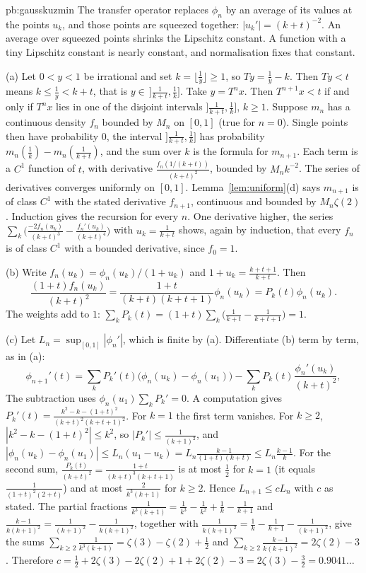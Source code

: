 \begin{solution}{pb:gausskuzmin}
\idea The transfer operator replaces $\phi_n$ by an average of its values at the points $u_k$, and those points are squeezed together: $|u_k'|=(k+t)^{-2}$. An average over squeezed points shrinks the Lipschitz constant. A function with a tiny Lipschitz constant is nearly constant, and normalisation fixes that constant.

\writeup (a) Let $0<y<1$ be irrational and set $k=\lfloor\frac1y\rfloor\ge1$, so $Ty=\frac1y-k$. Then $Ty<t$ means $k\le\frac1y<k+t$, that is $y\in\,]\frac1{k+t},\frac1k]$. Take $y=T^nx$. Then $T^{n+1}x<t$ if and only if $T^nx$ lies in one of the disjoint intervals $]\frac1{k+t},\frac1k]$, $k\ge1$. Suppose $m_n$ has a continuous density $f_n$ bounded by $M_n$ on $[0,1]$ (true for $n=0$). Single points then have probability $0$, the interval $]\frac1{k+t},\frac1k]$ has probability $m_n(\frac1k)-m_n(\frac1{k+t})$, and the sum over $k$ is the formula for $m_{n+1}$. Each term is a $C^1$ function of $t$, with derivative $\frac{f_n(1/(k+t))}{(k+t)^2}$, bounded by $M_nk^{-2}$. The series of derivatives converges uniformly on $[0,1]$. Lemma~\ref{lem:uniform}(d) says $m_{n+1}$ is of class $C^1$ with the stated derivative $f_{n+1}$, continuous and bounded by $M_n\zeta(2)$. Induction gives the recursion for every $n$. One derivative higher, the series $\sum_k\bigl(\frac{-2f_n(u_k)}{(k+t)^3}-\frac{f_n'(u_k)}{(k+t)^4}\bigr)$ with $u_k=\frac1{k+t}$ shows, again by induction, that every $f_n$ is of class $C^1$ with a bounded derivative, since $f_0=1$.

(b) Write $f_n(u_k)=\phi_n(u_k)/(1+u_k)$ and $1+u_k=\frac{k+t+1}{k+t}$. Then
\[
\frac{(1+t)f_n(u_k)}{(k+t)^2}=\frac{1+t}{(k+t)(k+t+1)}\phi_n(u_k)=P_k(t)\phi_n(u_k).
\]
The weights add to $1$: $\sum_kP_k(t)=(1+t)\sum_k\bigl(\frac1{k+t}-\frac1{k+t+1}\bigr)=1$.

(c) Let $L_n=\sup_{[0,1]}|\phi_n'|$, which is finite by (a). Differentiate (b) term by term, as in (a):
\[
\phi_{n+1}'(t)=\sum_kP_k'(t)\bigl(\phi_n(u_k)-\phi_n(u_1)\bigr)-\sum_kP_k(t)\frac{\phi_n'(u_k)}{(k+t)^2},
\]
The subtraction uses $\phi_n(u_1)\sum_kP_k'=0$. A computation gives $P_k'(t)=\frac{k^2-k-(1+t)^2}{(k+t)^2(k+t+1)^2}$. For $k=1$ the first term vanishes. For $k\ge2$, $|k^2-k-(1+t)^2|\le k^2$, so $|P_k'|\le\frac1{(k+1)^2}$, and $|\phi_n(u_k)-\phi_n(u_1)|\le L_n(u_1-u_k)=L_n\frac{k-1}{(1+t)(k+t)}\le L_n\frac{k-1}k$. For the second sum, $\frac{P_k(t)}{(k+t)^2}=\frac{1+t}{(k+t)^3(k+t+1)}$ is at most $\frac12$ for $k=1$ (it equals $\frac1{(1+t)^2(2+t)}$) and at most $\frac2{k^3(k+1)}$ for $k\ge2$. Hence $L_{n+1}\le cL_n$ with $c$ as stated. The partial fractions $\frac1{k^3(k+1)}=\frac1{k^3}-\frac1{k^2}+\frac1k-\frac1{k+1}$ and $\frac{k-1}{k(k+1)^2}=\frac1{(k+1)^2}-\frac1{k(k+1)^2}$, together with $\frac1{k(k+1)^2}=\frac1k-\frac1{k+1}-\frac1{(k+1)^2}$, give the sums $\sum_{k\ge2}\frac1{k^3(k+1)}=\zeta(3)-\zeta(2)+\frac12$ and $\sum_{k\ge2}\frac{k-1}{k(k+1)^2}=2\zeta(2)-3$. Therefore $c=\frac12+2\zeta(3)-2\zeta(2)+1+2\zeta(2)-3=2\zeta(3)-\frac32=0.9041\ldots$


\end{solution}
